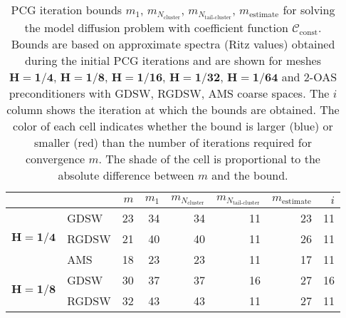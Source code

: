 \begin{table}[H]
\centering
\caption{PCG iteration bounds $m_1$, $m_{N_{\text{cluster}}}$, $m_{N_{\text{tail-cluster}}}$, $m_{\text{estimate}}$ for solving the model diffusion problem with coefficient function $\mathcal{C}_{\mathrm{const}}$. Bounds are based on approximate spectra (Ritz values) obtained during the initial PCG iterations and are shown for meshes $\mathbf{H=1/4}$, $\mathbf{H=1/8}$, $\mathbf{H=1/16}$, $\mathbf{H=1/32}$, $\mathbf{H=1/64}$ and 2-OAS preconditioners with GDSW, RGDSW, AMS coarse spaces. The $i$ column shows the iteration at which the bounds are obtained. The color of each cell indicates whether the bound is larger (blue) or smaller (red) than the number of iterations required for convergence $m$. The shade of the cell is proportional to the absolute difference between $m$ and the bound.}
\label{tab:cg_iteration_bound_coef=const}
\begin{tabular}{llrrrrrr}
\toprule
 &  & $m$ & $m_1$ & $m_{N_{\text{cluster}}}$ & $m_{N_{\text{tail-cluster}}}$ & $m_{\text{estimate}}$ & $i$ \\
\midrule
\multirow[c]{3}{*}{$\mathbf{H=1/4}$} & GDSW & 23 & {\cellcolor[HTML]{AFC9F6}} \color[HTML]{000000} 34 & {\cellcolor[HTML]{AFC9F6}} \color[HTML]{000000} 34 & {\cellcolor[HTML]{945357}} \color[HTML]{F1F1F1} 11 & {\cellcolor[HTML]{7EAFF1}} \color[HTML]{000000} 23 & 11 \\
\cline{2-8}
 & RGDSW & 21 & {\cellcolor[HTML]{AFC9F6}} \color[HTML]{000000} 40 & {\cellcolor[HTML]{AFC9F6}} \color[HTML]{000000} 40 & {\cellcolor[HTML]{945357}} \color[HTML]{F1F1F1} 11 & {\cellcolor[HTML]{7EAFF1}} \color[HTML]{000000} 26 & 11 \\
\cline{2-8}
 & AMS & 18 & {\cellcolor[HTML]{7EAFF1}} \color[HTML]{000000} 23 & {\cellcolor[HTML]{7EAFF1}} \color[HTML]{000000} 23 & {\cellcolor[HTML]{BB9CA9}} \color[HTML]{F1F1F1} 11 & {\cellcolor[HTML]{945357}} \color[HTML]{F1F1F1} 17 & 11 \\
\cline{1-8} \cline{2-8}
\multirow[c]{3}{*}{$\mathbf{H=1/8}$} & GDSW & 30 & {\cellcolor[HTML]{7EAFF1}} \color[HTML]{000000} 37 & {\cellcolor[HTML]{7EAFF1}} \color[HTML]{000000} 37 & {\cellcolor[HTML]{BB9CA9}} \color[HTML]{F1F1F1} 16 & {\cellcolor[HTML]{945357}} \color[HTML]{F1F1F1} 27 & 16 \\
\cline{2-8}
 & RGDSW & 32 & {\cellcolor[HTML]{7EAFF1}} \color[HTML]{000000} 43 & {\cellcolor[HTML]{7EAFF1}} \color[HTML]{000000} 43 & {\cellcolor[HTML]{BB9CA9}} \color[HTML]{F1F1F1} 11 & {\cellcolor[HTML]{945357}} \color[HTML]{F1F1F1} 27 & 11 \\

\end{tabular}
\end{table}
